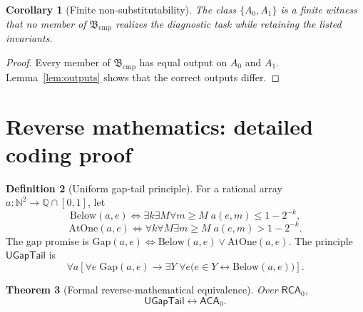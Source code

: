 \documentclass[11pt]{article}
\newcommand{\RCA}{\ensuremath{\mathsf{RCA}_0}}
\newcommand{\ACA}{\ensuremath{\mathsf{ACA}_0}}
\newcommand{\UGapTail}{\ensuremath{\mathsf{UGapTail}}}
\newcommand{\Base}{\ensuremath{\mathfrak B}}
\theoremstyle{plain}
\newtheorem{theorem}{Theorem}[section]
\newtheorem{corollary}[theorem]{Corollary}
\theoremstyle{definition}
\newtheorem{definition}[theorem]{Definition}
\theoremstyle{remark}
\begin{document}
\begin{corollary}[Finite non-substitutability]
The class $\{A_0,A_1\}$ is a finite witness that no member of
$\Base_{\mathrm{cmp}}$ realizes the diagnostic task while retaining the listed
invariants.
\end{corollary}

\begin{proof}
Every member of $\Base_{\mathrm{cmp}}$ has equal output on $A_0$ and $A_1$.
Lemma~\ref{lem:outputs} shows that the correct outputs differ.
\end{proof}

\section{Reverse mathematics: detailed coding proof}
\label{sec:reverse}

\begin{definition}[Uniform gap-tail principle]
For a rational array $a:\mathbb N^2\to\mathbb Q\cap[0,1]$, let
\[
\mathrm{Below}(a,e)\iff
\exists k\exists M\forall m\geq M\;a(e,m)\leq1-2^{-k},
\]
\[
\mathrm{AtOne}(a,e)\iff
\forall k\forall M\exists m\geq M\;a(e,m)>1-2^{-k}.
\]
The gap promise is $\mathrm{Gap}(a,e)\iff\mathrm{Below}(a,e)\vee
\mathrm{AtOne}(a,e)$.  The principle $\UGapTail$ is
\[
\forall a\left[
\forall e\;\mathrm{Gap}(a,e)
\rightarrow
\exists Y\;\forall e\bigl(e\in Y\leftrightarrow\mathrm{Below}(a,e)\bigr)
\right].
\]
\end{definition}

\begin{theorem}[Formal reverse-mathematical equivalence]
Over $\RCA$,
\[
\UGapTail\leftrightarrow\ACA.
\]
\end{theorem}
\end{document}

